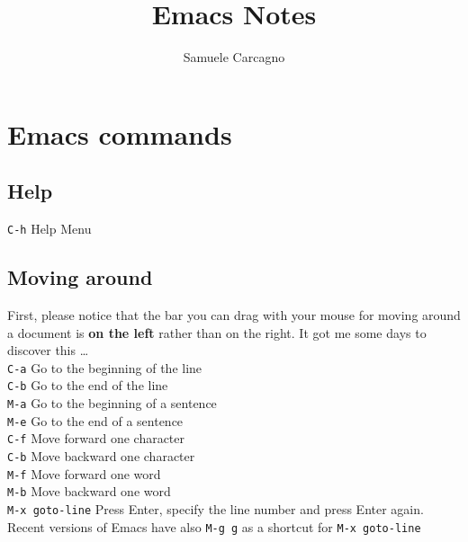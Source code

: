 \documentclass[a4paper,12pt]{report}
\title{Emacs Notes}
\author{Samuele Carcagno}
\begin{document}
\setlength{\parindent}{0pt}

\maketitle
\tableofcontents

\chapter{Emacs commands}





\section{Help}

\texttt{C-h} Help Menu \\

\section{Moving around}

First, please notice that the bar you can drag with your mouse for moving around a document is \textbf{on the left} rather than on the right. It got me some days to discover this \ldots \\

\texttt{C-a} Go to the beginning of the line \\

\texttt{C-b} Go to the end of the line \\

\texttt{M-a} Go to the beginning of a sentence \\

\texttt{M-e} Go to the end  of a sentence \\

\texttt{C-f} Move forward one character \\

\texttt{C-b} Move backward one character \\

\texttt{M-f} Move forward one word \\

\texttt{M-b} Move backward one word \\

\texttt{M-x goto-line} Press Enter, specify the line number and press Enter again. \\
Recent versions of Emacs have also
\texttt{M-g g} as a shortcut for \texttt{M-x goto-line} \\
\end{document}
